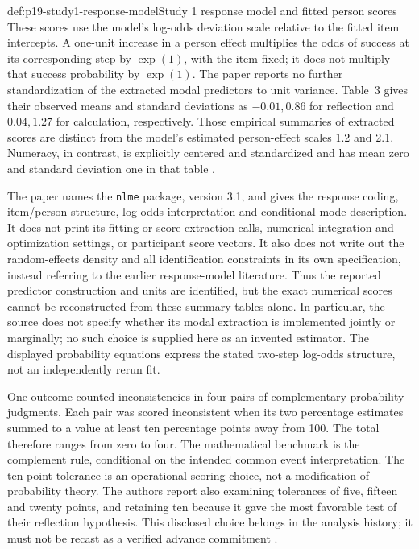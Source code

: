 \begin{hbdefinition}{def:p19-study1-response-model}{Study 1 response model and fitted person scores}
These scores use the model's log-odds deviation scale relative to the fitted
item intercepts. A one-unit increase in a person effect multiplies the odds
of success at its corresponding step by \(\exp(1)\), with the item fixed;
it does not multiply that success probability by \(\exp(1)\). The paper
reports no further standardization of the extracted modal predictors to unit
variance. Table~3 gives their observed means and standard deviations as
\(-0.01,0.86\) for reflection and \(0.04,1.27\) for calculation,
respectively. Those empirical summaries of extracted scores are distinct from
the model's estimated person-effect scales 1.2 and 2.1. Numeracy, in contrast,
is explicitly centered and standardized and has mean zero and standard
deviation one in that table \cite[pp.~4, 6--7]{SinayevPeters2015Calculation}.

The paper names the \texttt{nlme} package, version 3.1, and gives the response
coding, item/person structure, log-odds interpretation and conditional-mode
description. It does not print its fitting or score-extraction calls, numerical
integration and optimization settings, or participant score vectors. It also
does not write out the random-effects density and all identification constraints
in its own specification, instead referring to the earlier response-model
literature. Thus the reported predictor construction and units are identified,
but the exact numerical scores cannot be reconstructed from these summary
tables alone. In particular, the source does not specify whether its modal
extraction is implemented jointly or marginally; no such choice is supplied
here as an invented estimator. The displayed probability equations express
the stated two-step log-odds structure, not an independently rerun fit.
\end{hbdefinition}

One outcome counted inconsistencies in four pairs of complementary probability
judgments. Each pair was scored inconsistent when its two percentage estimates
summed to a value at least ten percentage points away from 100. The total
therefore ranges from zero to four. The mathematical benchmark is the
complement rule, conditional on the intended common event interpretation.
The ten-point tolerance is an operational scoring choice, not a modification
of probability theory. The authors report also examining tolerances of five,
fifteen and twenty points, and retaining ten because it gave the most favorable
test of their reflection hypothesis. This disclosed choice belongs in the
analysis history; it must not be recast as a verified advance commitment
\cite[p.~4]{SinayevPeters2015Calculation}.

